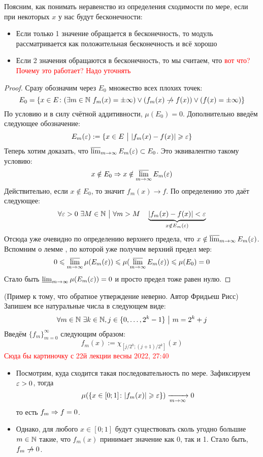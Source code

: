 \begin{note}
	Поясним, как понимать неравенство из определения сходимости по мере, если при некоторых $x$ у нас будут бесконечности:
	\begin{itemize}
		\item Если только 1 значение обращается в бесконечность, то модуль рассматривается как положительная бесконечность и всё хорошо
		
		\item Если 2 значения обращаются в бесконечность, то мы считаем, что \textcolor{red}{вот что? Почему это работает? Надо уточнять}
	\end{itemize}
\end{note}

\begin{proof}
	Сразу обозначим через $E_0$ множество всех плохих точек:
	\[
		E_0 = \{x \in E \colon (\exists m \in \N\ f_m(x) = \pm\infty) \vee (f_m(x) \centernot\to f(x)) \vee (f(x) = \pm\infty)\}
	\]
	По условию и в силу счётной аддитивности, $\mu(E_0) = 0$. Дополнительно введём следующее обозначение:
	\[
		E_m(\varepsilon) := \{x \in E \ \big|\  |f_m(x) - f(x)| \geqslant \varepsilon\}
	\]
	Теперь хотим доказать, что $\varlimsup_{m \to \infty} E_m(\varepsilon) \subset E_0$. Это эквивалентно такому условию:
	\[
		x \notin E_0 \Rightarrow x \notin \varlimsup_{m \to \infty} E_m(\varepsilon)
	\]
	Действительно, если $x \notin E_0$, то значит $f_m(x) \to f$. По определению это даёт следующее:
	\[
		\forall \varepsilon > 0\ \exists M \in \mathbb{N} \ \big|\  \forall m > M \quad \underbrace{|f_m(x) - f(x)| < \varepsilon}_{x \notin E_m(\varepsilon)}
	\]
	Отсюда уже очевидно по определению верхнего предела, что $x \notin \varlimsup_{m \to \infty} E_m(\varepsilon)$. Вспомним о лемме \label{lem1}, по которой уже получим верхний предел мер:
	\[
		0 \leqslant \varlimsup_{m \to \infty} \mu(E_m(\varepsilon)) \leqslant \mu(\varlimsup_{m \to \infty} E_m(\varepsilon)) \leqslant \mu(E_0) = 0
	\]
	Стало быть $\varliminf_{m \to \infty} \mu(E_m(\varepsilon)) = 0$ и просто предел тоже равен нулю.
\end{proof}

\begin{example} (Пример к тому, что обратное утверждение неверно. Автор Фридьеш Рисс)
	Запишем все натуральные числа в следующем виде:
	\[
		\forall m \in \mathbb{N}\ \exists k \in \mathbb{N}, j \in \{0, \ldots, 2^k - 1\} \ \big|\  m = 2^k + j
	\]
	Введём $\{f_m\}_{m = 0}^\infty$ следующим образом:
	\[
		f_m(x) := \chi_{[j / 2^k; (j + 1) / 2^k]}(x)
	\]
	\textcolor{red}{Сюда бы картиночку с 22й лекции весны 2022, 27:40}
	\begin{itemize}
		\item Посмотрим, куда сходится такая последовательность по мере. Зафиксируем $\varepsilon > 0$, тогда
		\[
			\mu(\{x \in [0; 1] \colon |f_m(x)| \geqslant \varepsilon\}) \xrightarrow[m \to \infty]{} 0
		\]
		то есть $f_m \Rightarrow f = 0$.
		
		\item Однако, для любого $x \in [0; 1]$ будут существовать сколь угодно большие $m \in \mathbb{N}$ такие, что $f_m(x)$ принимает значение как 0, так и 1. Стало быть, $f_m \centernot\to 0$.
	\end{itemize}
\end{example}

